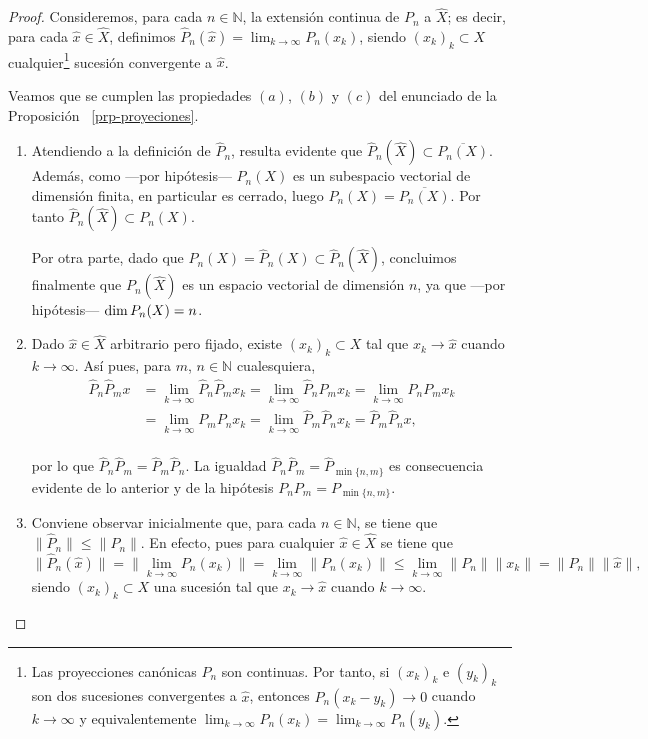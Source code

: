 \documentclass[
  spanish,
  letterpaper,
  DIV=11,
  numbers=noendperiod]{scrreprt}
\theoremstyle{definition}
\theoremstyle{remark}
\theoremstyle{definition}
\theoremstyle{exampstyle}
\theoremstyle{plain}
\theoremstyle{plain}
\theoremstyle{definition}
\theoremstyle{plain}
\theoremstyle{remark}
\begin{document}
\begin{proof}
\leavevmode

\hspace*{1cm}

Consideremos, para cada \(n\in\mathbb{N}\), la extensión continua de
\(P_n\) a \(\widehat{X}\); es decir, para cada
\(\widehat{x}\in\widehat{X}\), definimos
\(\widehat{P}_n(\widehat{x})= \lim_{k\to\infty}P_n(x_k)\), siendo
\((x_k)_k\subset X\)
cualquier\footnote{Las proyecciones canónicas $P_n$ son continuas. Por tanto, si $(x_k)_k$ e $(y_k)_k$ son dos sucesiones convergentes a $\widehat{x}$, entonces $\widehat{P}_n(x_k-y_k)\to 0$ cuando $k\to\infty$ y equivalentemente $\lim_{k\to\infty}P_n(x_k)=\lim_{k\to\infty}P_n(y_k)$.}
sucesión convergente a \(\widehat{x}\).

Veamos que se cumplen las propiedades \((a)\), \((b)\) y \((c)\) del
enunciado de la Proposición ~\ref{prp-proyeciones}.

\begin{enumerate}
\def\labelenumi{(\alph{enumi})}
\item
  Atendiendo a la definición de \(\widehat{P}_n\), resulta evidente que
  \(\widehat{P}_n(\widehat{X})\subset\overline{P_n(X)}\). Además, como
  ---por hipótesis--- \(P_n(X)\) es un subespacio vectorial de dimensión
  finita, en particular es cerrado, luego \(P_n(X)=\overline{P_n(X)}\).
  Por tanto \(\widehat{P}_n(\widehat{X})\subset P_n(X)\).

  Por otra parte, dado que
  \(P_n(X)=\widehat{P}_n(X)\subset\widehat{P}_n(\widehat{X})\),
  concluimos finalmente que \(P_n(\widehat{X})\) es un espacio vectorial
  de dimensión \(n\), ya que ---por hipótesis---
  \({\rm dim}\,P_n(X)=n\).
\item
  Dado \(\widehat{x}\in \widehat{X}\) arbitrario pero fijado, existe
  \((x_k)_k\subset X\) tal que \(x_k\to\widehat{x}\) cuando
  \(k\to\infty\). Así pues, para \(m\), \(n\in\mathbb{N}\) cualesquiera,
  \begin{align*}
  \widehat{P}_n\widehat{P}_mx & = \lim_{k \to\infty}{\widehat{P}_n\widehat{P}_mx_k} = \lim_{k \rightarrow\infty}{\widehat{P}_nP_mx_k} = \lim_{k \rightarrow\infty}{P_nP_mx_k}\\ & =  \lim_{k \rightarrow\infty}{P_mP_nx_k} = \lim_{k \rightarrow\infty}{\widehat{P}_m\widehat{P}_nx_k} = \widehat{P}_m\widehat{P}_nx,
  \end{align*}
  \\
  por lo que \(\widehat{P}_n\widehat{P}_m=\widehat{P}_m\widehat{P}_n\).
  La igualdad \(\widehat{P}_n\widehat{P}_m=\widehat{P}_{\min\{n,m\}}\)
  es consecuencia evidente de lo anterior y de la hipótesis
  \(P_nP_m=P_{\min\{n,m\}}\).
\item
  Conviene observar inicialmente que, para cada \(n\in\mathbb{N}\), se
  tiene que \(\|\widehat{P}_n\|\leq\|P_n\|\). En efecto, pues para
  cualquier \(\widehat{x}\in\widehat{X}\) se tiene que \[
  \|\widehat{P}_n(\widehat{x})\| = \|\lim_{k \to \infty}P_n(x_k)\| = \lim_{k\to \infty}\|P_n(x_k)\| \leq \lim_{k \to \infty}\|P_n\|\|x_k\| = \|P_n\|\|\widehat{x}\|,
  \] siendo \((x_k)_k\subset X\) una sucesión tal que
  \(x_k\to \widehat{x}\) cuando \(k\to\infty\).


\end{enumerate}
\end{proof}
\end{document}
